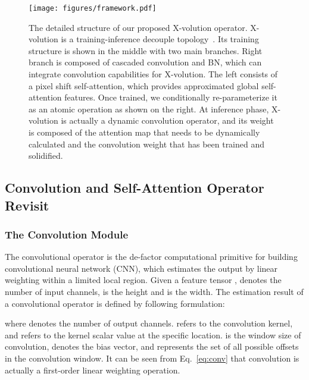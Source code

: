 \documentclass{article}
\begin{document}
\begin{figure}[t]	
    \centering	
	\texttt{[image: figures/framework.pdf]}
	\small
	\caption{The detailed structure of our proposed X-volution operator. X-volution is a training-inference decouple topology~\cite{DBLP:journals/corr/abs-2101-03697}.
	Its training structure is shown in the middle with two main branches.
	Right branch is composed of cascaded convolution and BN, which can integrate convolution capabilities for X-volution.
	The left consists of a pixel shift self-attention, which provides approximated global self-attention features.
	Once trained, we conditionally re-parameterize it as an atomic operation as shown on the right.
	At inference phase, X-volution is actually a dynamic convolution operator, and its weight is composed of the attention map that needs to be dynamically calculated and the convolution weight that has been trained and solidified.
	}
    \label{fig:framework}
\end{figure}

\subsection{Convolution and Self-Attention Operator Revisit}










\subsubsection{The Convolution Module}
The convolutional operator is the de-factor computational primitive for building convolutional neural network (CNN), which estimates the output by linear weighting within a limited local region.
Given a feature tensor {\small}, {\small} denotes the number of input channels,  is the height and  is the width.
The estimation result {\small} of a convolutional operator is defined by following formulation:

where {\small} denotes the number of output channels.
{\small} refers to the convolution kernel, and {\small} refers to the kernel scalar value at the specific location.  is the window size of convolution, {\small} denotes the bias vector, and {\small} represents the set of all possible offsets in the {\small} convolution window.
It can be seen from Eq.~\ref{eq:conv} that convolution is actually a first-order linear weighting operation.
\end{document}
